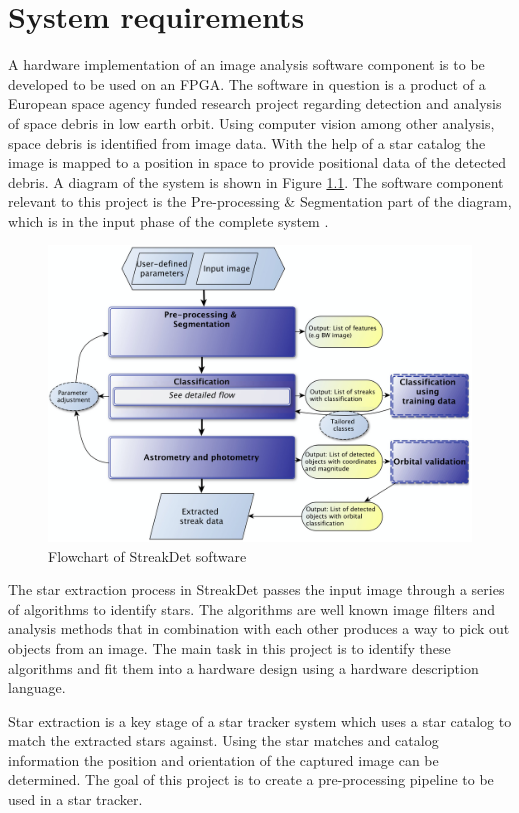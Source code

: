 \documentclass[12pt]{report}
\begin{document}
\chapter{System requirements}

A hardware implementation of an image analysis software component is to be developed to be used on an FPGA. The software in question is a product of a European space agency funded research project regarding detection and analysis of space debris in low earth orbit. Using computer vision among other analysis, space debris is identified from image data. With the help of a star catalog the image is mapped to a position in space to provide positional data of the detected debris. A diagram of the system is shown in Figure \ref{fig:0}. The software component relevant to this project is the Pre-processing \& Segmentation part of the diagram, which is in the input phase of the complete system \citep{StreakDet} \citep{Starmatch}.

\begin{figure}[h]
    \centering
    \includegraphics[scale=0.2]{figures/streakdet.png}
    \caption{Flowchart of StreakDet software \citep{StreakDet}}
    \label{fig:0}
\end{figure}

The star extraction process in StreakDet passes the input image through a series of algorithms to identify stars. The algorithms are well known image filters and analysis methods that in combination with each other produces a way to pick out objects from an image. The main task in this project is to identify these algorithms and fit them into a hardware design using a hardware description language.
\par
Star extraction is a key stage of a star tracker system which uses a star catalog to match the extracted stars against. Using the star matches and catalog information the position and orientation of the captured image can be determined. The goal of this project is to create a pre-processing pipeline to be used in a star tracker.
\end{document}
